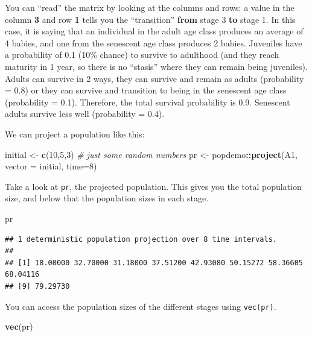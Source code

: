 \documentclass[
  a4paper]{book}
\newenvironment{Shaded}{\begin{snugshade}}{\end{snugshade}}
\newcommand{\AttributeTok}[1]{\textcolor[rgb]{0.13,0.29,0.53}{#1}}
\newcommand{\CommentTok}[1]{\textcolor[rgb]{0.56,0.35,0.01}{\textit{#1}}}
\newcommand{\DecValTok}[1]{\textcolor[rgb]{0.00,0.00,0.81}{#1}}
\newcommand{\FunctionTok}[1]{\textcolor[rgb]{0.13,0.29,0.53}{\textbf{#1}}}
\newcommand{\NormalTok}[1]{#1}
\newcommand{\OtherTok}[1]{\textcolor[rgb]{0.56,0.35,0.01}{#1}}
\newcommand{\SpecialCharTok}[1]{\textcolor[rgb]{0.81,0.36,0.00}{\textbf{#1}}}
\begin{document}
You can ``read'' the matrix by looking at the columns and rows: a value in the column \textbf{3} and row \textbf{1} tells you the ``transition'' \textbf{from} stage 3 \textbf{to} stage 1. In this case, it is saying that an individual in the adult age class produces an average of 4 babies, and one from the senescent age class produces 2 babies. Juveniles have a probability of 0.1 (10\% chance) to survive to adulthood (and they reach maturity in 1 year, so there is no ``stasis'' where they can remain being juveniles). Adults can survive in 2 ways, they can survive and remain as adults (probability = 0.8) or they can survive and transition to being in the senescent age class (probability = 0.1). Therefore, the total survival probability is 0.9. Senescent adults survive less well (probability = 0.4).

We can project a population like this:

\begin{Shaded}
\begin{Highlighting}[]
\NormalTok{initial }\OtherTok{\textless{}{-}} \FunctionTok{c}\NormalTok{(}\DecValTok{10}\NormalTok{,}\DecValTok{5}\NormalTok{,}\DecValTok{3}\NormalTok{) }\CommentTok{\# just some random numbers}
\NormalTok{pr }\OtherTok{\textless{}{-}}\NormalTok{ popdemo}\SpecialCharTok{::}\FunctionTok{project}\NormalTok{(A1, }\AttributeTok{vector =}\NormalTok{ initial, }\AttributeTok{time=}\DecValTok{8}\NormalTok{)}
\end{Highlighting}
\end{Shaded}

Take a look at \texttt{pr}, the projected population. This gives you the total population size, and below that the population sizes in each stage.

\begin{Shaded}
\begin{Highlighting}[]
\NormalTok{pr}
\end{Highlighting}
\end{Shaded}

\begin{verbatim}
## 1 deterministic population projection over 8 time intervals.
## 
## [1] 18.00000 32.70000 31.18000 37.51200 42.93080 50.15272 58.36605 68.04116
## [9] 79.29730
\end{verbatim}

You can access the population sizes of the different stages using \texttt{vec(pr)}.

\begin{Shaded}
\begin{Highlighting}[]
\FunctionTok{vec}\NormalTok{(pr)}
\end{Highlighting}
\end{Shaded}
\end{document}
